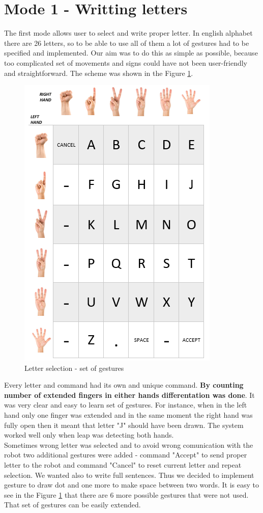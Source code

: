 \section{Mode 1 - Writting letters}
The first mode allows user to select and write proper letter. In english alphabet there are 26 letters, so to be able to use all of them a lot of gestures had to be specified and implemented. Our aim was to do this as simple as possible, because too complicated set of movements and signs could have not been user-friendly and straightforward. The scheme was shown in the Figure \ref{fig:letters}.

\begin{figure}[H]
	\includegraphics{static_gestures}
	\centering
	\caption{Letter selection - set of gestures}
	\label{fig:letters}
\end{figure}

Every letter and command had its own and unique command. \textbf{By counting number of extended fingers in either hands differentation was done}. It was very clear and easy to learn set of gestures. For instance, when in the left hand only one finger was extended and in the same moment the right hand was fully open then it meant that letter "J" should have been drawn. The system worked well only when leap was detecting both hands.\\

Sometimes wrong letter was selected and to avoid wrong comunication with the robot two additional gestures were added - command "Accept" to send proper letter to the robot and command "Cancel" to reset current letter and repeat selection. We wanted also to write full sentences. Thus we decided to implement gesture to draw dot and one more to make space between two words. It is easy to see in the Figure \ref{fig:letters} that there are 6 more possible gestures that were not used. That set of gestures can be easily extended. 